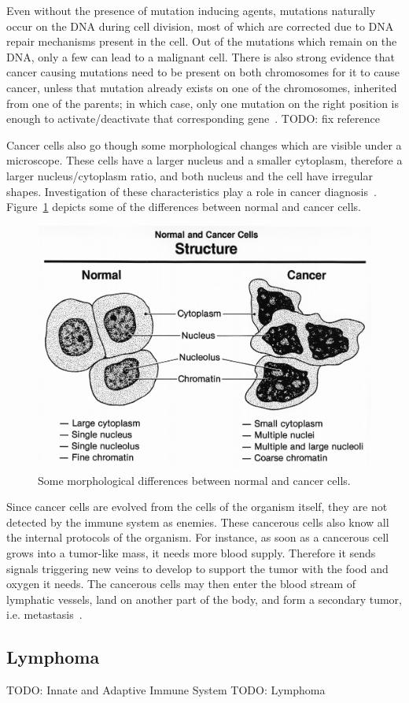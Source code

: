 Even without the presence of mutation inducing agents, mutations naturally occur on the DNA during cell division, most of which are corrected due to DNA repair mechanisms present in the cell. Out of the mutations which remain on the DNA, only a few can lead to a malignant cell. There is also strong evidence that cancer causing mutations need to be present on both chromosomes for it to cause cancer, unless that mutation already exists on one of the chromosomes, inherited from one of the parents; in which case, only one mutation on the right position is enough to activate/deactivate that corresponding gene~\cite{mutation-both-chromosomes}. TODO: fix reference 

Cancer cells also go though some morphological changes which are visible under a microscope. These cells have a larger nucleus and a smaller cytoplasm, therefore a larger nucleus/cytoplasm ratio, and both nucleus and the cell have irregular shapes. Investigation of these characteristics play a role in cancer diagnosis~\cite{baba2007tumor}. Figure~\ref{fig:bkg:normal-cancer} depicts some of the differences between normal and cancer cells.

\begin{figure}[!ht]
  \centering
  \includegraphics[width=.8\textwidth]{figs/background/Normal_and_cancer_cells_structure}
  \caption{Some morphological differences between normal and cancer cells.}
  \label{fig:bkg:normal-cancer}
\end{figure}

Since cancer cells are evolved from the cells of the organism itself, they are not detected by the immune system as enemies. These cancerous cells also know all the internal protocols of the organism. For instance, as soon as a cancerous cell grows into a tumor-like mass, it needs more blood supply. Therefore it sends signals triggering new veins to develop to support the tumor with the food and oxygen it needs. The cancerous cells may then enter the blood stream of lymphatic vessels, land on another part of the body, and form a secondary tumor, i.e. metastasis~\cite[Ch. 20]{the-cell}.


\subsection{Lymphoma}
TODO: Innate and Adaptive Immune System
TODO: Lymphoma
